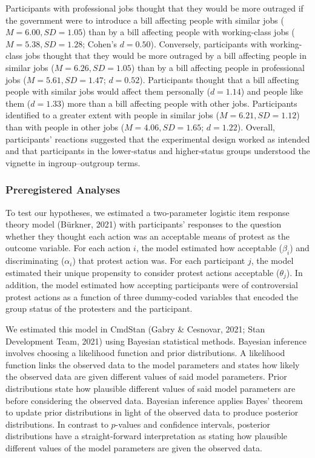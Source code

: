 \documentclass[12pt, letterpaper]{article}
\begin{document}
Participants with professional jobs thought that they would be more
outraged if the government were to introduce a bill affecting people
with similar jobs (\(M = 6.00, SD = 1.05\)) than by a bill affecting
people with working-class jobs (\(M = 5.38, SD = 1.28\); Cohen's
\(d = 0.50\)). Conversely, participants with working-class jobs thought
that they would be more outraged by a bill affecting people in similar
jobs (\(M = 6.26, SD = 1.05\)) than by a bill affecting people in
professional jobs (\(M = 5.61, SD = 1.47\); \(d = 0.52\)). Participants
thought that a bill affecting people with similar jobs would affect them
personally (\(d = 1.14\)) and people like them (\(d = 1.33\)) more than
a bill affecting people with other jobs. Participants identified to a
greater extent with people in similar jobs (\(M = 6.21, SD = 1.12\))
than with people in other jobs (\(M = 4.06, SD = 1.65\); \(d = 1.22\)).
Overall, participants' reactions suggested that the experimental design
worked as intended and that participants in the lower-status and
higher-status groups understood the vignette in ingroup--outgroup terms.

\hypertarget{preregistered-analyses}{%
\subsubsection{Preregistered Analyses}\label{preregistered-analyses}}

To test our hypotheses, we estimated a two-parameter logistic item
response theory model (Bürkner, 2021) with participants' responses to
the question whether they thought each action was an acceptable means of
protest as the outcome variable. For each action \(i\), the model
estimated how acceptable (\(\beta_i\)) and discriminating (\(\alpha_i\))
that protest action was. For each participant \(j\), the model estimated
their unique propensity to consider protest actions acceptable
(\(\theta_j\)). In addition, the model estimated how accepting
participants were of controversial protest actions as a function of
three dummy-coded variables that encoded the group status of the
protesters and the participant.

We estimated this model in CmdStan (Gabry \& Cesnovar, 2021; Stan
Development Team, 2021) using Bayesian statistical methods. Bayesian
inference involves choosing a likelihood function and prior
distributions. A likelihood function links the observed data to the
model parameters and states how likely the observed data are given
different values of said model parameters. Prior distributions state how
plausible different values of said model parameters are before
considering the observed data. Bayesian inference applies Bayes' theorem
to update prior distributions in light of the observed data to produce
posterior distributions. In contrast to \(p\)-values and confidence
intervals, posterior distributions have a straight-forward
interpretation as stating how plausible different values of the model
parameters are given the observed data.
\end{document}
